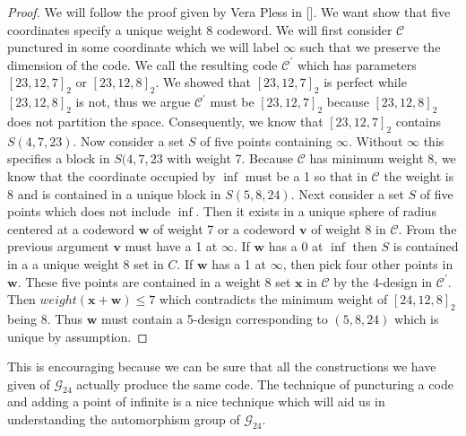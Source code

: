 \documentclass[paper=a4, fontsize=11pt]{scrartcl} %
\numberwithin{equation}{section} %
\numberwithin{figure}{section} %
\numberwithin{table}{section} %
\theoremstyle{break}
\begin{document}
\begin{proof}
We will follow the proof given by Vera Pless in [\cite{pless}]. We want show that five coordinates specify a unique weight 8 codeword. We will first consider $\mathcal{C}$ punctured in some coordinate which we will label $\infty$ such that we preserve the dimension of the code. We call the resulting code $\mathcal{C}^{'}$ which has parameters $[23,12,7]_2$ or $[23,12,8]_2$. We showed that $[23,12,7]_2$ is perfect while $[23,12,8]_2$ is not, thus we argue $\mathcal{C}^{'}$ must be $[23,12,7]_2$ because $[23,12,8]_2$ does not partition the space. Consequently, we know that $[23,12,7]_2$ contains $S(4,7,23)$.
Now consider a set $S$ of five points containing $\infty$. Without $\infty$ this specifies a block in $S(4,7,23$ with weight 7. Because $\mathcal{C}$ has minimum weight 8, we know that the coordinate occupied by $\inf$ must be a 1 so that in $\mathcal{C}$ the weight is 8 and is contained in a unique block in $S(5,8,24)$.
Next consider a set $S$ of five points which does not include $\inf$. Then it exists in a unique sphere of radius centered at a codeword $\textbf{w}$ of weight 7 or a codeword $\textbf{v}$ of weight 8 in $\mathcal{C}$. From the previous argument $\textbf{v}$ must have a 1 at $\infty$. If $\textbf{w}$ has a 0 at $\inf$ then $S$ is contained in a a unique weight 8 set in $C$. If $\textbf{w}$ has a 1 at $\infty$, then pick four other points in $\mathbf{w}$. These five points are contained in a weight 8 set $\textbf{x}$ in $\mathcal{C}$ by the 4-design in $\mathcal{C}^{'}$. Then $weight(\textbf{x} + \textbf{w}) \leq 7$ which contradicts the minimum weight of $[24,12,8]_2$ being 8. Thus $\textbf{w}$ must contain a 5-design corresponding to $(5,8,24)$ which is unique by assumption.
\end{proof}

This is encouraging because we can be sure that all the constructions we have given of $\mathcal{G}_{24}$ actually produce the same code. The technique of puncturing a code and adding a point of infinite is a nice technique which will aid us in understanding the automorphism group of $\mathcal{G}_{24}$.
\end{document}
